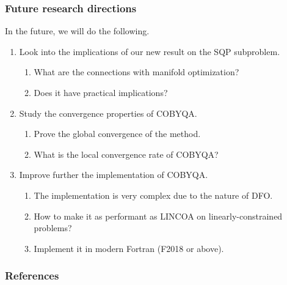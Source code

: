 \documentclass{polyu-presentation}
\begin{document}
\begin{frame}
    \frametitle{Future research directions}

	In the future, we will do the following.
    \begin{enumerate}
        \item Look into the \alert{implications} of our new result on the SQP subproblem.
        \begin{enumerate}
            \item What are the connections with \alert{manifold optimization}?
            \item Does it have practical implications?
        \end{enumerate}
        \item Study the \alert{convergence properties} of COBYQA.
        \begin{enumerate}
            \item Prove the global convergence of the method.
            \item What is the local convergence rate of COBYQA?
        \end{enumerate}
        \item Improve further the \alert{implementation} of COBYQA.
        \begin{enumerate}
            \item The implementation is very complex due to the nature of DFO.
            \item How to make it as performant as LINCOA on linearly-constrained problems?
            \item Implement it in modern Fortran (F2018 or above).
        \end{enumerate}
    \end{enumerate}
\end{frame}

\appendix

\begin{frame}[t,allowframebreaks]
    \frametitle{References}

	\printbibliography
\end{frame}
\end{document}
